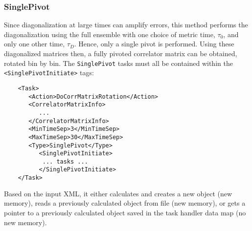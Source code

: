 \documentclass[12pt]{article}
\newcommand{\vb}{\texttt}
\begin{document}
\subsubsection{SinglePivot}
Since diagonalization at large times can amplify errors, this method performs the diagonalization using the full ensemble with one choice of metric time, $\tau_0$, and only one other time, $\tau_D$. Hence, only a single pivot is performed. Using these diagonalized matrices then, a fully pivoted correlator matrix can be obtained, rotated bin by bin. The \vb{SinglePivot} tasks must all be contained within the \vb{<SinglePivotInitiate>} tags:
\begin{verbatim}
    <Task>                                                                   
       <Action>DoCorrMatrixRotation</Action>                                 
       <CorrelatorMatrixInfo>                                                
          ...                                                                
       </CorrelatorMatrixInfo>                                               
       <MinTimeSep>3</MinTimeSep>                                            
       <MaxTimeSep>30</MaxTimeSep>                                           
       <Type>SinglePivot</Type>                                              
          <SinglePivotInitiate>                                                
           ... tasks ...                                                     
          </SinglePivotInitiate>                                               
    </Task>                                                                  
\end{verbatim}

Based on the input XML, it either calculates and creates a new object (new memory), reads a previously calculated object from file (new memory), or gets a pointer to a previously calculated object saved in the task handler data map (no new memory).
\end{document}
